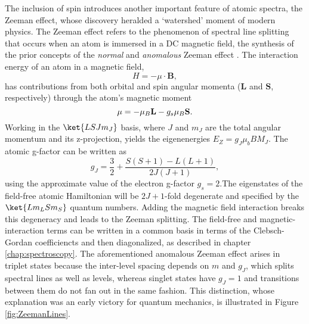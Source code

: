	The inclusion of spin introduces another important feature of atomic spectra, the Zeeman effect, whose discovery heralded a `watershed' moment of modern physics. The Zeeman effect refers to the phenomenon of spectral line splitting that occurs when an atom is immersed in a DC magnetic field, the synthesis of the prior concepts of the \emph{normal} and \emph{anomalous} Zeeman effect . The interaction energy of an atom in a magnetic field, 
	\begin{equation}
		H = -\mu\cdot \textbf{B},
	\end{equation}
	has contributions from both orbital and spin angular momenta ($\textbf{L}$ and $\textbf{S}$, respectively) through the atom's magnetic moment 
	\begin{equation}
		{\bf \mu} = -\mu_B\textbf{L} - g_s\mu_B \textbf{S}.
	\end{equation}
	Working in the $\ket{LSJm_J}$ basis, where $J$ and $m_J$ are the total angular momentum and its z-projection, yields the eigenenergies $E_Z = g_J \mu_b B M_J$. The atomic g-factor can be written as
	\begin{equation}
		g_J = \frac{3}{2} + \frac{S(S+1)-L(L+1)}{2J(J+1)},
	\end{equation}
	using the approximate value of the electron g-factor $g_s=2$.The eigenstates of the field-free atomic Hamiltonian will be $2J+1$-fold degenerate and specified by the $\ket{Lm_L S m_S}$ quantum numbers. Adding the magnetic field interaction breaks this degeneracy and leads to the Zeeman splitting. The field-free and magnetic-interaction terms can be written in a common basis in terms of the Clebsch-Gordan coefficiencts and then diagonalized, as described in chapter \ref{chap:spectroscopy}. The aforementioned anomalous Zeeman effect arises in triplet states because the inter-level spacing depends on $m$ and $g_J$, which splits spectral lines as well as levels, whereas singlet states have $g_J=1$ and transitions between them do not fan out in the same fashion. This distinction, whose explanation was an early victory for quantum mechanics, is illustrated in Figure \ref{fig:ZeemanLines}. 

